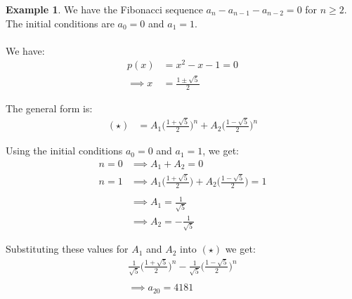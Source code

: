 \documentclass[]{article}
\theoremstyle{definition}
\newtheorem{ex}{Example}[section]
\begin{document}
		\begin{ex}
			We have the Fibonacci sequence $a_n - a_{n - 1} - a_{n - 2} = 0$ for $n \ge 2$. The initial conditions are $a_0 = 0$ and $a_1 = 1$.
			\\ \\
			We have:
			\begin{align*}
				p(x) &= x^2 - x - 1 = 0 \\
				\implies x &= \frac{1 \pm \sqrt{5}}{2}
			\end{align*}

			The general form is:
			\begin{align*}
				(\star) &= A_1 \bigg( \frac{1 + \sqrt{5}}{2} \bigg)^n + A_2 \bigg( \frac{1 - \sqrt{5}}{2} \bigg)^n
			\end{align*}

			Using the initial conditions $a_0 = 0$ and $a_1 = 1$, we get:
			\begin{align*}
				n = 0 &\implies A_1 + A_2 = 0 \\
				n = 1 &\implies A_1 \bigg( \frac{1 + \sqrt{5}}{2} \bigg) + A_2 \bigg( \frac{1 - \sqrt{5}}{2} \bigg) = 1 \\ \\
				&\implies A_1 = \frac{1}{\sqrt{5}} \\
				&\implies A_2 = - \frac{1}{\sqrt{5}}
			\end{align*}

			Substituting these values for $A_1$ and $A_2$ into $(\star)$ we get:
			\begin{align*}
				\frac{1}{\sqrt{5}} \bigg( \frac{1 + \sqrt{5}}{2} \bigg)^n - \frac{1}{\sqrt{5}} \bigg( \frac{1 - \sqrt{5}}{2} \bigg)^n \\ \\
				\implies a_{20} = 4181
			\end{align*}
		\end{ex}
\end{document}
